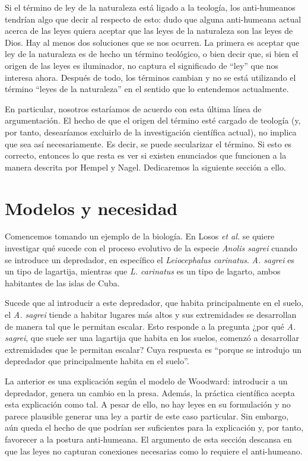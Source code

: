 Si el término de ley de la naturaleza está ligado a la teología, los anti-humeanos tendrían algo que decir al respecto de esto: dudo que alguna anti-humeana actual acerca de las leyes quiera aceptar que las leyes de la naturaleza son las leyes de Dios. Hay al menos dos soluciones que se nos ocurren. La primera es aceptar que ley de la naturaleza es de hecho un término teológico, o bien decir que, si bien el origen de las leyes es iluminador, no captura el significado de ``ley'' que nos interesa ahora. Después de todo, los términos cambian y no se está utilizando el término ``leyes de la naturaleza'' en el sentido que lo entendemos actualmente.

En particular, nosotros estaríamos de acuerdo con esta última línea de argumentación. El hecho de que el origen del término esté cargado de teología (y, por tanto, desearíamos excluirlo de la investigación científica actual), no implica que sea así necesariamente. Es decir, se puede secularizar el término. Si esto es correcto, entonces lo que resta es ver si existen enunciados que funcionen a la manera descrita por Hempel y Nagel. Dedicaremos la siguiente sección a ello.

\section{Modelos y necesidad}

\noindent Comencemos tomando un ejemplo de la biología. En Losos \emph{et al.}\citeyear{Losos2004} se quiere investigar qué sucede con el proceso evolutivo de la especie \textit{Anolis sagrei} cuando se introduce un depredador, en específico el \textit{Leiocephalus carinatus}. \textit{A. sagrei}  es un tipo de lagartija, mientras que \textit{L. carinatus} es un tipo de lagarto, ambos habitantes de las islas de Cuba.

Sucede que al introducir a este depredador, que habita principalmente en el suelo, el \textit{A. sagrei} tiende a habitar lugares más altos y sus extremidades se desarrollan de manera tal que le permitan escalar. Esto responde a la pregunta ¿por qué \textit{A. sagrei}, que suele ser una lagartija que habita en los suelos, comenzó a desarrollar extremidades que le permitan escalar? Cuya respuesta es ``porque se introdujo un depredador que principalmente habita en el suelo''.

La anterior es una explicación según el modelo de Woodward: introducir a un depredador, genera un cambio en la presa. Además, la práctica científica acepta esta explicación como tal. A pesar de ello, no hay leyes en su formulación y no parece plausible generar una ley a partir de este caso particular. Sin embargo, aún queda el hecho de que podrían ser suficientes para la explicación y, por tanto, favorecer a la postura anti-humeana. El argumento de esta sección descansa en que las leyes no capturan conexiones necesarias como lo requiere el anti-humeano.

